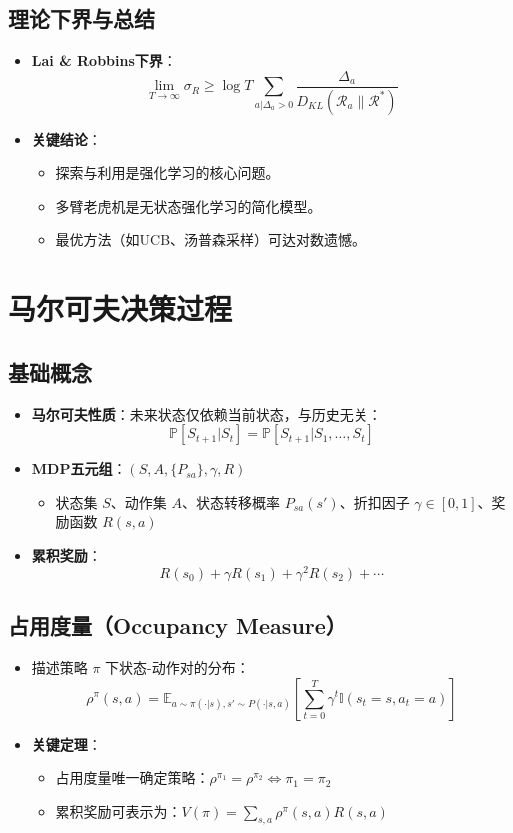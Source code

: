 \subsection{理论下界与总结}
\begin{itemize}
    \item \textbf{Lai \& Robbins下界}：
        \[
        \lim_{T \to \infty} \sigma_R \geq \log T \sum_{a|\Delta_a > 0} \frac{\Delta_a}{D_{KL}(\mathcal{R}_a \| \mathcal{R}^*)}
        \]
    \item \textbf{关键结论}：
        \begin{itemize}
            \item 探索与利用是强化学习的核心问题。
            \item 多臂老虎机是无状态强化学习的简化模型。
            \item 最优方法（如UCB、汤普森采样）可达对数遗憾。
        \end{itemize}
\end{itemize}
\section{马尔可夫决策过程}
\subsection{基础概念}
\begin{itemize}
    \item \textbf{马尔可夫性质}：未来状态仅依赖当前状态，与历史无关：
        \[
        \mathbb{P}[S_{t+1}|S_t] = \mathbb{P}[S_{t+1}|S_1, \dots, S_t]
        \]
    \item \textbf{MDP五元组}：\((S, A, \{P_{sa}\}, \gamma, R)\)
        \begin{itemize}
            \item 状态集 \(S\)、动作集 \(A\)、状态转移概率 \(P_{sa}(s')\)、折扣因子 \(\gamma \in [0,1]\)、奖励函数 \(R(s,a)\)
        \end{itemize}
    \item \textbf{累积奖励}：
        \[
        R(s_0) + \gamma R(s_1) + \gamma^2 R(s_2) + \cdots
        \]
\end{itemize}

\subsection{占用度量（Occupancy Measure）}
\begin{itemize}
    \item 描述策略 \(\pi\) 下状态-动作对的分布：
        \[
        \rho^\pi(s,a) = \mathbb{E}_{a \sim \pi(\cdot|s), s' \sim P(\cdot|s,a)} \left[ \sum_{t=0}^T \gamma^t \mathbb{I}(s_t=s, a_t=a) \right]
        \]
    \item \textbf{关键定理}：
        \begin{itemize}
            \item 占用度量唯一确定策略：\(\rho^{\pi_1} = \rho^{\pi_2} \iff \pi_1 = \pi_2\)
            \item 累积奖励可表示为：\(V(\pi) = \sum_{s,a} \rho^\pi(s,a) R(s,a)\)
        \end{itemize}
\end{itemize}

